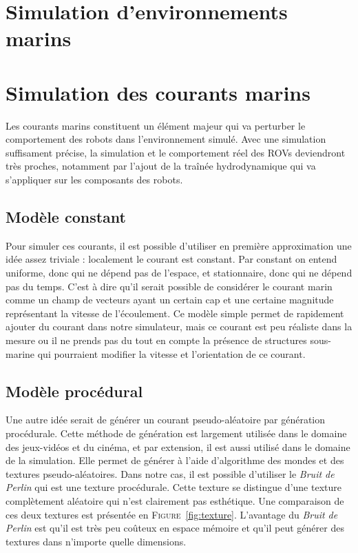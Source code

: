 	\section{Simulation d'environnements marins}

		\section{Simulation des courants marins}

			Les courants marins constituent un élément majeur qui va perturber le comportement des robots dans l'environnement simulé. Avec une simulation suffisament précise, la simulation et le comportement réel des \gls{ROV}s deviendront très proches, notamment par l'ajout de la traînée hydrodynamique qui va s'appliquer sur les composants des robots.

			\subsection{Modèle constant}

				Pour simuler ces courants, il est possible d'utiliser en première approximation une idée assez triviale : localement le courant est constant. Par constant on entend uniforme, donc qui ne dépend pas de l'espace, et stationnaire, donc qui ne dépend pas du temps. C'est à dire qu'il serait possible de considérer le courant marin  comme un champ de vecteurs ayant un certain cap et une certaine magnitude représentant la vitesse de l'écoulement. Ce modèle simple permet de rapidement ajouter du courant dans notre simulateur, mais ce courant est peu réaliste dans la mesure ou il ne prends pas du tout en compte la présence de structures sous-marine qui pourraient modifier la vitesse et l'orientation de ce courant.

			\subsection{Modèle procédural}

				Une autre idée serait de générer un courant pseudo-aléatoire par génération procédurale. Cette méthode de génération est largement utilisée dans le domaine des jeux-vidéos et du cinéma, et par extension, il est aussi utilisé dans le domaine de la simulation. Elle permet de générer à l'aide d'algorithme des mondes et des textures pseudo-aléatoires. Dans notre cas, il est possible d'utiliser le \textit{Bruit de Perlin} qui est une texture procédurale. Cette texture se distingue d'une texture complètement aléatoire qui n'est clairement pas esthétique. Une comparaison de ces deux textures est présentée en \textsc{Figure}~\ref{fig:texture}. L'avantage du \textit{Bruit de Perlin} est qu'il est très peu coûteux en espace mémoire et qu'il peut générer des textures dans n'importe quelle dimensions. 
				
